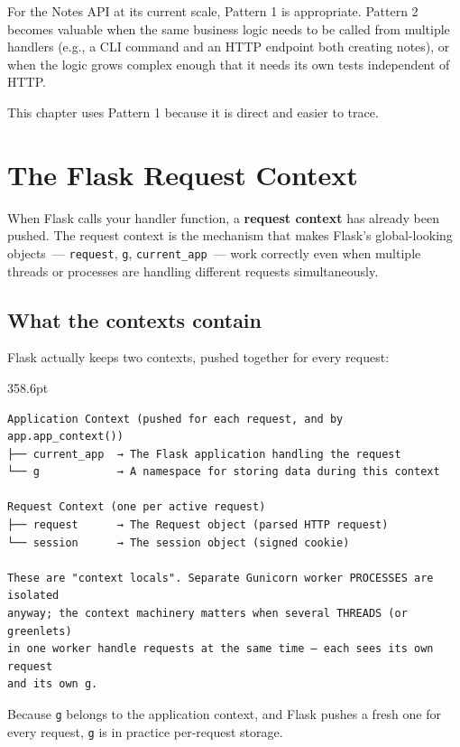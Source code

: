 \noindent{}For the Notes API at its current scale, Pattern 1 is appropriate. Pattern 2 becomes valuable when the same business logic needs to be called from multiple handlers (e.g., a CLI command and an HTTP endpoint both creating notes), or when the logic grows complex enough that it needs its own tests independent of HTTP.

This chapter uses Pattern 1 because it is direct and easier to trace.

\setcounter{section}{1}
\section{The Flask Request Context}\label{33-logic-execution:332-the-flask-request-context}

When Flask calls your handler function, a \textbf{request context} has already been pushed. The request context is the mechanism that makes Flask's global-looking objects~--- \texttt{request}, \texttt{g}, \texttt{current\_app}~--- work correctly even when multiple threads or processes are handling different requests simultaneously.

\subsection*{What the contexts contain}\label{33-logic-execution:what-the-contexts-contain}

Flask actually keeps two contexts, pushed together for every request:

\begin{diagrambox}[short]{358.6pt}
\begin{Verbatim}[fontsize=\fontsize{9.0}{8.55}\selectfont]
Application Context (pushed for each request, and by app.app_context())
├── current_app  → The Flask application handling the request
└── g            → A namespace for storing data during this context

Request Context (one per active request)
├── request      → The Request object (parsed HTTP request)
└── session      → The session object (signed cookie)

These are "context locals". Separate Gunicorn worker PROCESSES are isolated
anyway; the context machinery matters when several THREADS (or greenlets)
in one worker handle requests at the same time — each sees its own request
and its own g.
\end{Verbatim}
\end{diagrambox}

\noindent{}Because \texttt{g} belongs to the application context, and Flask pushes a fresh one for every request, \texttt{g} is in practice per-request storage.

